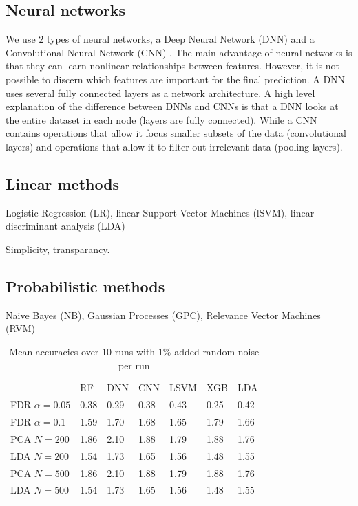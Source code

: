 \documentclass[a4paper,10pt]{article}
\begin{document}
\subsection{Neural networks}

We use $2$ types of neural networks, a Deep Neural Network (DNN) \cite{lecun2015deep} and a Convolutional Neural Network (CNN) \cite{Lecun98}. The main advantage of neural networks is that they can learn nonlinear relationships between features. However, it is not possible to discern which features are important for the final prediction. A DNN uses several fully connected layers as a network architecture. A high level explanation of the difference between DNNs and CNNs is that a DNN looks at the entire dataset in each node (layers are fully connected). While a CNN contains operations that allow it focus smaller subsets of the data (convolutional layers) and operations that allow it to filter out irrelevant data (pooling layers).

\subsection{Linear methods}

Logistic Regression (LR), linear Support Vector Machines (lSVM), linear discriminant analysis (LDA)

Simplicity, transparancy.

\subsection{Probabilistic methods}
%
Naive Bayes (NB), Gaussian Processes (GPC), Relevance Vector Machines (RVM)


% 
\begin{table}[htp]
\centering
\caption{Mean accuracies over $10$ runs with $1\%$ added random noise per run}
\label{tab:diversitymetrics}
\begin{tabular}{lllllll}
				& RF     & DNN 		& CNN  		& LSVM 		& 	XGB 	& 	LDA  \\
FDR $\alpha=0.05$		& 0.38   &  0.29      	&  0.38     	&  0.43    	& 0.25    	& 0.42  \\
FDR $\alpha=0.1$ 		& 1.59   &  1.70      	&  1.68 	&  1.65    	& 1.79    	& 1.66  \\
PCA $N=200$    			& 1.86   &  2.10      	&  1.88         &  1.79    	& 1.88          & 1.76  \\
LDA $N=200$        		& 1.54   &  1.73      	&  1.65         &  1.56    	& 1.48          & 1.55  \\
PCA $N=500$    			& 1.86   &  2.10      	&  1.88         &  1.79    	& 1.88          & 1.76  \\
LDA $N=500$        		& 1.54   &  1.73      	&  1.65         &  1.56    	& 1.48          & 1.55  \\
\end{tabular}
\end{table}
%
\end{document}
